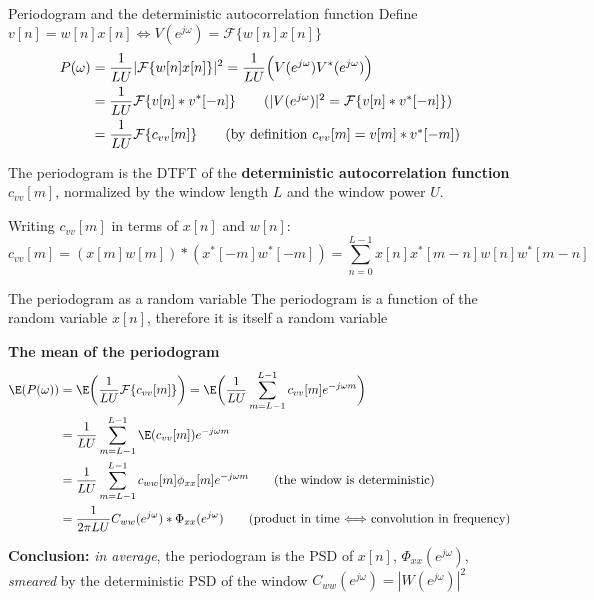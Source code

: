 \documentclass[10pt, aspectratio=169, handout]{beamer}
\begin{document}
%
\begin{frame}{Periodogram and the deterministic autocorrelation function}
Define $v[n] = w[n]x[n] \Longleftrightarrow V(e^{j\omega}) = \mathcal{F}\{w[n]x[n]\}$
\begin{align*}
	P(\omega) &= \frac{1}{LU}|\mathcal{F}\{w[n]x[n]\}|^2 =  \frac{1}{LU}\Big(V(e^{j\omega})V^*(e^{j\omega})\Big) \\
	&=\frac{1}{LU}\mathcal{F}\{v[n]\ast v^*[-n]\} \tag{$|V(e^{j\omega})|^2 =\mathcal{F}\{v[n]\ast v^*[-n]\}$}  \\
	&=\frac{1}{LU}\mathcal{F}\{c_{vv}[m]\} \tag{by definition $c_{vv}[m] = v[m]\ast v^*[-m]$}
\end{align*}

The periodogram is the DTFT of the \textbf{deterministic autocorrelation function} $c_{vv}[m]$, normalized by the window length $L$ and the window power $U$.

\vspace{0.5cm}
Writing $c_{vv}[m]$ in terms of $x[n]$ and $w[n]$:
\begin{equation*}
	c_{vv}[m] = (x[m]w[m])\ast (x^*[-m]w^*[-m]) = \sum_{n = 0}^{L-1} x[n]x^*[m-n]w[n]w^*[m-n]
\end{equation*}

\end{frame}

\begin{frame}{The periodogram as a random variable}
The periodogram is a function of the random variable $x[n]$, therefore it is itself a random variable

\textbf{The mean of the periodogram}
\begin{align*}
	\E(P(\omega)) &= \E\bigg(\frac{1}{LU}\mathcal{F}\{c_{vv}[m]\}\bigg) = \E\bigg(\frac{1}{LU}\sum_{m=L-1}^{L-1}c_{vv}[m]e^{-j\omega m}\bigg) \\
	& = \frac{1}{LU}\sum_{m=L-1}^{L-1}\E(c_{vv}[m])e^{-j\omega m} \\
	& = \frac{1}{LU}\sum_{m=L-1}^{L-1}c_{ww}[m]\phi_{xx}[m]e^{-j\omega m} \tag{the window is deterministic} \\
	& = \frac{1}{2\pi LU}C_{ww}(e^{j\omega})\ast \Phi_{xx}(e^{j\omega}) \tag{product in time $\Longleftrightarrow$ convolution in frequency} \\
\end{align*}

\vspace{-0.25cm}
\textbf{Conclusion:} \textit{in average}, the periodogram is the PSD of $x[n]$, $\Phi_{xx}(e^{j\omega})$, \textit{smeared} by the deterministic PSD of the window $C_{ww}(e^{j\omega}) = |W(e^{j\omega})|^2$
\end{frame}
\end{document}
